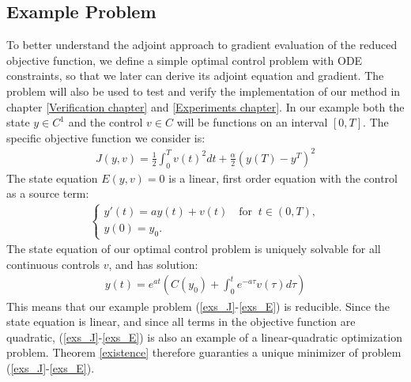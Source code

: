 \subsection{Example Problem} \label{example_sec}
To better understand the adjoint approach to gradient evaluation of the reduced objective function, we define a simple optimal control problem with ODE constraints, so that we later can derive its adjoint equation and gradient. The problem will also be used to test and verify the implementation of our method in chapter \ref{Verification chapter} and \ref{Experiments chapter}. In our example both the state $y\in C^1$ and the control $v\in C$ will be functions on an interval $[0,T]$. The specific objective function we consider is:
\begin{align}
J(y,v) = \frac{1}{2}\int_0^Tv(t)^2dt + \frac{\alpha}{2}(y(T)-y^T)^2 \label{exs_J}
\end{align}
The state equation $E(y,v)=0$ is a linear, first order equation with the control as a source term:
\begin{align}
\left\{
     \begin{array}{lr}
       	y'(t)=ay(t) + v(t) \quad \textrm{for } \ t\in(0,T),\\
       	y(0)=y_0.
     \end{array}
   \right. \label{exs_E}
\end{align}
The state equation of our optimal control problem is uniquely solvable for all continuous controls $v$, and has solution:
\begin{align*}
y(t) = e^{a t}(C(y_0)+\int_0^te^{-a\tau}v(\tau)d\tau)
\end{align*}
This means that our example problem (\ref{exs_J}-\ref{exs_E}) is reducible. Since the state equation is linear, and since all terms in the objective function are quadratic, (\ref{exs_J}-\ref{exs_E}) is also an example of a linear-quadratic optimization problem. Theorem \ref{existence} therefore guaranties a unique minimizer of problem (\ref{exs_J}-\ref{exs_E}).
